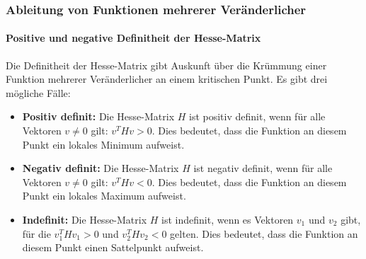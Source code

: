 \documentclass{beamer}
\begin{document}
  \begin{frame}
    \frametitle{Ableitung von Funktionen mehrerer Veränderlicher}
    \framesubtitle{Positive und negative Definitheit der Hesse-Matrix}
  
    Die Definitheit der Hesse-Matrix gibt Auskunft über die Krümmung einer Funktion mehrerer Veränderlicher an einem kritischen Punkt. Es gibt drei mögliche Fälle:
  
    \vspace{1em}
  
    \begin{itemize}
      \item \textbf{Positiv definit:} Die Hesse-Matrix $H$ ist positiv definit, wenn für alle Vektoren $v \neq 0$ gilt: $v^T H v > 0$. Dies bedeutet, dass die Funktion an diesem Punkt ein lokales Minimum aufweist.
  
      \vspace{0.5em}
  
      \item \textbf{Negativ definit:} Die Hesse-Matrix $H$ ist negativ definit, wenn für alle Vektoren $v \neq 0$ gilt: $v^T H v < 0$. Dies bedeutet, dass die Funktion an diesem Punkt ein lokales Maximum aufweist.
  
      \vspace{0.5em}
  
      \item \textbf{Indefinit:} Die Hesse-Matrix $H$ ist indefinit, wenn es Vektoren $v_1$ und $v_2$ gibt, für die $v_1^T H v_1 > 0$ und $v_2^T H v_2 < 0$ gelten. Dies bedeutet, dass die Funktion an diesem Punkt einen Sattelpunkt aufweist.
    \end{itemize}
  \end{frame}
  
\end{document}
